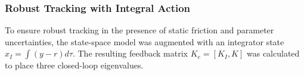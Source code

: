 \subsubsection{Robust Tracking with Integral Action}
To ensure robust tracking in the presence of static friction and parameter uncertainties, the state-space model was augmented with an integrator state $x_I = \int (y-r) d\tau$. The resulting feedback matrix $K_e = [K_I, K]$ was calculated to place three closed-loop eigenvalues. 